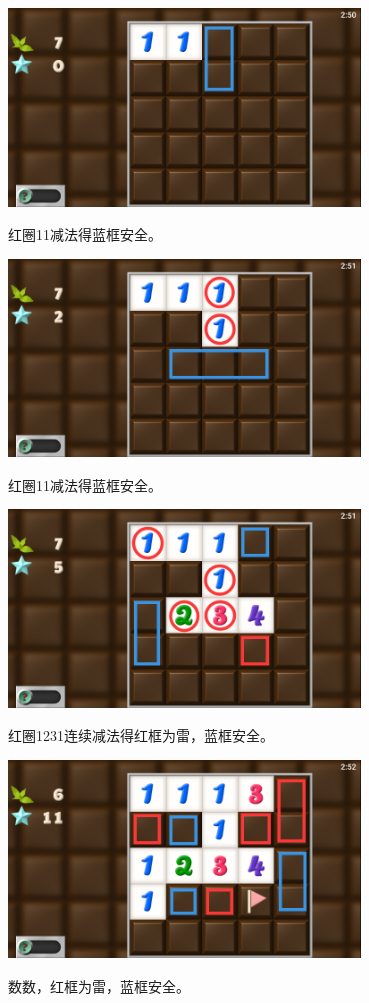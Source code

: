 \subsection{} %
\begin{center}
    \includegraphics[width=0.7\textwidth]{puzzle/35-1.png}
\end{center}
红圈11减法得蓝框安全。
\begin{center}
    \includegraphics[width=0.7\textwidth]{puzzle/35-2.png}
\end{center}
红圈11减法得蓝框安全。
\begin{center}
    \includegraphics[width=0.7\textwidth]{puzzle/35-3.png}
\end{center}
红圈1231连续减法得红框为雷，蓝框安全。
\begin{center}
    \includegraphics[width=0.7\textwidth]{puzzle/35-4.png}
\end{center}
数数，红框为雷，蓝框安全。

